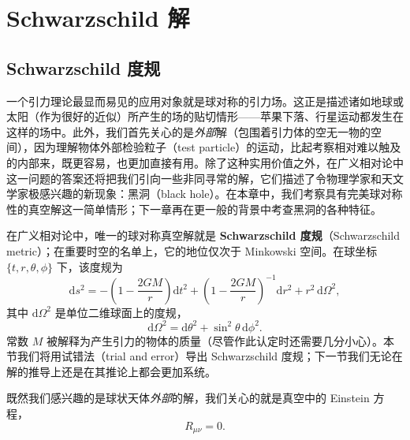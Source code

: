 
\chapter{Schwarzschild 解}

\section{Schwarzschild 度规}

一个引力理论最显而易见的应用对象就是球对称的引力场。这正是描述诸如地球或太阳（作为很好的近似）所产生的场的贴切情形——苹果下落、行星运动都发生在这样的场中。此外，我们首先关心的是\emph{外部}解（包围着引力体的空无一物的空间），因为理解物体外部检验粒子（test particle）的运动，比起考察相对难以触及的内部来，既更容易，也更加直接有用。除了这种实用价值之外，在广义相对论中这一问题的答案还将把我们引向一些非同寻常的解，它们描述了令物理学家和天文学家极感兴趣的新现象：黑洞（black hole）。在本章中，我们考察具有完美球对称性的真空解这一简单情形；下一章再在更一般的背景中考查黑洞的各种特征。

在广义相对论中，唯一的球对称真空解就是 \textbf{Schwarzschild 度规}（Schwarzschild metric）；在重要时空的名单上，它的地位仅次于 Minkowski 空间。在球坐标 $\{t, r, \theta, \phi\}$ 下，该度规为
\begin{equation*}
\mathrm{d}s^2 = -\left(1 - \frac{2GM}{r}\right)\mathrm{d}t^2 + \left(1 - \frac{2GM}{r}\right)^{-1}\mathrm{d}r^2 + r^2\,\mathrm{d}\Omega^2,
\tag{5.1}
\end{equation*}
其中 $\mathrm{d}\Omega^2$ 是单位二维球面上的度规，
\begin{equation*}
\mathrm{d}\Omega^2 = \mathrm{d}\theta^2 + \sin^2\theta\,\mathrm{d}\phi^2.
\tag{5.2}
\end{equation*}
常数 $M$ 被解释为产生引力的物体的质量（尽管作此认定时还需要几分小心）。本节我们将用试错法（trial and error）导出 Schwarzschild 度规；下一节我们无论在解的推导上还是在其推论上都会更加系统。

既然我们感兴趣的是球状天体\emph{外部}的解，我们关心的就是真空中的 Einstein 方程，
\begin{equation*}
R_{\mu\nu} = 0.
\tag{5.3}
\end{equation*}

